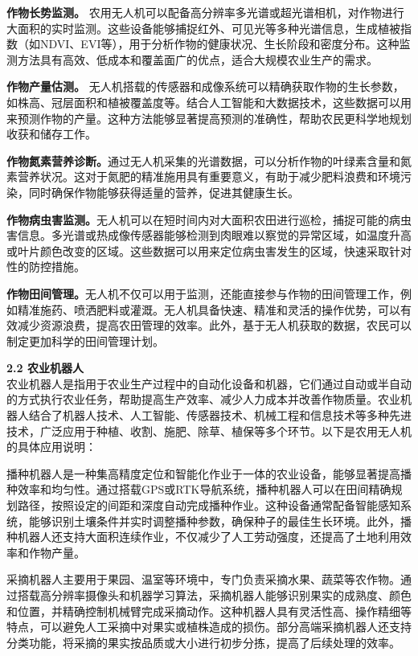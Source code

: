 \textbf{作物长势监测。} 农用无人机可以配备高分辨率多光谱或超光谱相机，对作物进行大面积的实时监测。这些设备能够捕捉红外、可见光等多种光谱信息，生成植被指数（如NDVI、EVI等），用于分析作物的健康状况、生长阶段和密度分布。这种监测方法具有高效、低成本和覆盖面广的优点，适合大规模农业生产的需求。

\textbf{作物产量估测。} 无人机搭载的传感器和成像系统可以精确获取作物的生长参数，如株高、冠层面积和植被覆盖度等。结合人工智能和大数据技术，这些数据可以用来预测作物的产量。这种方法能够显著提高预测的准确性，帮助农民更科学地规划收获和储存工作。

\textbf{作物氮素营养诊断。}通过无人机采集的光谱数据，可以分析作物的叶绿素含量和氮素营养状况。这对于氮肥的精准施用具有重要意义，有助于减少肥料浪费和环境污染，同时确保作物能够获得适量的营养，促进其健康生长。

\textbf{作物病虫害监测。}无人机可以在短时间内对大面积农田进行巡检，捕捉可能的病虫害信息。多光谱或热成像传感器能够检测到肉眼难以察觉的异常区域，如温度升高或叶片颜色改变的区域。这些数据可以用来定位病虫害发生的区域，快速采取针对性的防控措施。

\textbf{作物田间管理。}无人机不仅可以用于监测，还能直接参与作物的田间管理工作，例如精准施药、喷洒肥料或灌溉。无人机具备快速、精准和灵活的操作优势，可以有效减少资源浪费，提高农田管理的效率。此外，基于无人机获取的数据，农民可以制定更加科学的田间管理计划。

\textbf{2.2 农业机器人} \\
农业机器人是指用于农业生产过程中的自动化设备和机器，它们通过自动或半自动的方式执行农业任务，帮助提高生产效率、减少人力成本并改善作物质量。农业机器人结合了机器人技术、人工智能、传感器技术、机械工程和信息技术等多种先进技术，广泛应用于种植、收割、施肥、除草、植保等多个环节。以下是农用无人机的具体应用说明：

播种机器人是一种集高精度定位和智能化作业于一体的农业设备，能够显著提高播种效率和均匀性。通过搭载GPS或RTK导航系统，播种机器人可以在田间精确规划路径，按照设定的间距和深度自动完成播种作业。这种设备通常配备智能感知系统，能够识别土壤条件并实时调整播种参数，确保种子的最佳生长环境。此外，播种机器人还支持大面积连续作业，不仅减少了人工劳动强度，还提高了土地利用效率和作物产量。

采摘机器人主要用于果园、温室等环境中，专门负责采摘水果、蔬菜等农作物。通过搭载高分辨率摄像头和机器学习算法，采摘机器人能够识别果实的成熟度、颜色和位置，并精确控制机械臂完成采摘动作。这种机器人具有灵活性高、操作精细等特点，可以避免人工采摘中对果实或植株造成的损伤。部分高端采摘机器人还支持分类功能，将采摘的果实按品质或大小进行初步分拣，提高了后续处理的效率。

